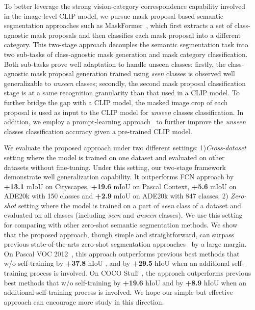 \documentclass[runningheads]{llncs}
\begin{document}
To better leverage the strong vision-category correspondence capability involved in the image-level CLIP model, we pursue mask proposal based semantic segmentation approaches such as MaskFormer~\cite{cheng2021per}, which first extracts a set of class-agnostic mask proposals and then classifies each mask proposal into a different category. This two-stage approach decouples the semantic segmentation task into two sub-tasks of class-agnostic mask generation and mask category classification. Both sub-tasks prove well adaptation to handle unseen classes: firstly, the class-agnostic mask proposal generation trained using \emph{seen} classes is observed well generalizable to \emph{unseen} classes; secondly, the second mask proposal classification stage is at a same recognition granularity than that used in a CLIP model. To further bridge the gap with a CLIP model, the masked image crop of each proposal is used as input to the CLIP model for \emph{unseen} classes classification. In addition, we employ a prompt-learning approach~\cite{liu2021pre} to further improve the \emph{unseen} classes classification accuracy given a pre-trained CLIP model.


We evaluate the proposed approach under two different settings: 1)\emph{Cross-dataset} setting where the model is trained on one dataset and evaluated on other datasets without fine-tuning. Under this setting, our two-stage framework demonstrate well generalization capability. It outperforms FCN approach by \textbf{+13.1} mIoU on Cityscapes, \textbf{+19.6} mIoU on Pascal Context, \textbf{+5.6} mIoU on ADE20k with 150 classes and \textbf{+2.9} mIoU on ADE20k with 847 classes. 2) \emph{Zero-shot} setting where the model is trained on a part of \emph{seen} class of a dataset and evaluated on all classes (including \emph{seen} and \emph{unseen} classes). We use this setting for comparing with other zero-shot semantic segmentation methods. We show that the proposed approach, though simple and straightforward, can surpass previous state-of-the-arts zero-shot segmentation approaches~\cite{bucher2019zero,pastore2021closer,xian2019semantic,gu2020context} by a large margin. On Pascal VOC 2012~\cite{everingham2011pascal}, this approach outperforms previous best methods that w/o self-training by \textbf{+37.8} hIoU , and by \textbf{+29.5} hIoU when an additional self-training process is involved. On COCO Stuff~\cite{caesar2018coco}, the approach outperforms previous best methods that w/o self-training by \textbf{+19.6} hIoU and by \textbf{+8.9} hIoU when an additional self-training process is involved. We hope our simple but effective approach can encourage more study in this direction.
\end{document}
